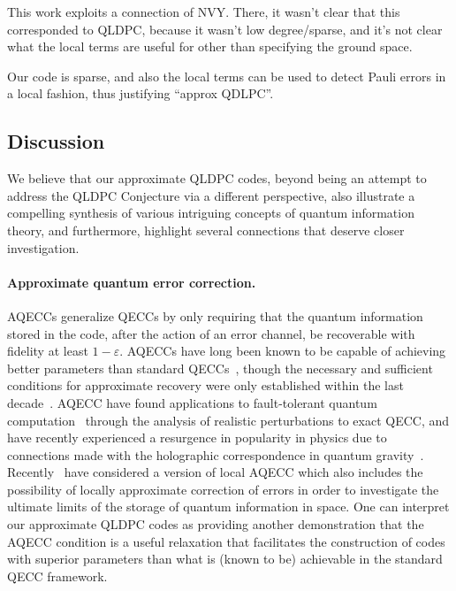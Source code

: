 \documentclass[11pt,letterpaper]{article}
\theoremstyle{definition}
\theoremstyle{remark}
\let\epsilon=\varepsilon
\numberwithin{equation}{section}
\newcommand{\eps}{\epsilon}
\let\origparagraph\paragraph
\renewcommand{\paragraph}[1]{\origparagraph{#1.}}
\theoremstyle{definition}
\begin{document}
This work exploits a connection of NVY. There, it wasn’t clear that this corresponded to QLDPC, because it wasn’t low degree/sparse, and it’s not clear what the local terms are useful for other than specifying the ground space.

Our code is sparse, and also the local terms can be used to detect Pauli errors in a local fashion, thus justifying ``approx QDLPC''.
\fi
\subsection{Discussion}

We believe that our approximate QLDPC codes, beyond being an attempt to address the QLDPC Conjecture via a different perspective, also illustrate a compelling synthesis of various intriguing concepts of quantum information theory, and furthermore, highlight several connections that deserve closer investigation.

\paragraph{Approximate quantum error correction} AQECCs generalize QECCs by only requiring that the quantum information stored in the code, after the action of an error channel, be recoverable with fidelity at least $1 -\eps$.  AQECCs have long been known to be capable of achieving better parameters than standard QECCs~\cite{leung1997approximate, crepeau2005approximate}, though the necessary and sufficient conditions for approximate recovery were only established within the last decade~\cite{beny2010general}.   AQECC have found applications to fault-tolerant quantum computation~\cite{bravyi2010topological,lee2017topological} through the analysis of realistic perturbations to exact QECC, and have recently experienced a resurgence in popularity in physics due to connections made with the holographic correspondence in quantum gravity~\cite{almheiri2015bulk}.  Recently~\cite{flammia2017limits} have considered a version of local AQECC which also includes the possibility of locally approximate correction of errors in order to investigate the ultimate limits of the storage of quantum information in space.   One can interpret our approximate QLDPC codes as providing another demonstration that the AQECC condition is a useful relaxation that facilitates the construction of codes with superior parameters than what is (known to be) achievable in the standard QECC framework.
%
\end{document}

